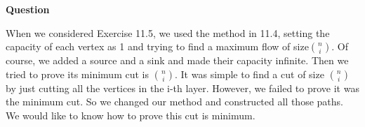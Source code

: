\documentclass{article} %
\begin{document}
 \textbf{Question}\par

  	When we considered Exercise 11.5, we used the method in 11.4, setting the capacity of each vertex as 1 and trying to find a maximum flow of size$\binom{n}{i}$. Of course, we added a source and a sink and made their capacity infinite. Then we tried to prove its minimum cut is $\binom{n}{i}$. It was simple to find a cut of size $\binom{n}{i}$ by just cutting all the vertices in the i-th layer. However, we failed to prove it was the minimum cut. So we changed our method and constructed all those paths. We would like to know how to prove this cut is minimum.
\end{document}
